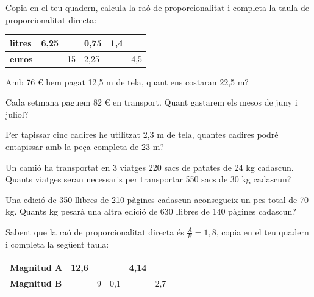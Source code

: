 
\begin{activitats}

\begin{mylist}
\exer
  Copia en el teu quadern, calcula la raó de proporcionalitat i completa
  la taula de proporcionalitat directa:

\begin{tabular}[]{@{}llllll@{}}
\toprule
\textbf{litres} & 6,25 & & 0,75 & 1,4 &\tabularnewline
\midrule
\textbf{euros} & & 15 & 2,25 & & 4,5\tabularnewline
\bottomrule
\end{tabular}



\exer
  Amb 76 \euro{} hem pagat 12,5 m de tela, quant ens costaran 22,5 m?
\answers{136.8 \euro{}}

\exer
  Cada setmana paguem 82 \euro{} en transport. Quant gastarem els mesos
  de juny i juliol?

\exer
  Per tapissar cinc cadires he utilitzat 2,3 m de tela, quantes
  cadires podré entapissar amb la peça completa de 23 m?


\exer
  Un camió ha transportat en 3 viatges 220 sacs de patates de 24 kg
  cadascun. Quants viatges seran necessaris per transportar 550 sacs de
  30 kg cadascun?
  
  
\exer
  Una edició de 350 llibres de 210 pàgines cadascun aconsegueix un pes
  total de 70 kg. Quants kg pesarà una altra edició de 630 llibres de
  140 pàgines cadascun?
  
  
\exer
  Sabent que la raó de proporcionalitat directa és $\frac{A}{B}
  = 1,8$, copia en el teu quadern i completa la següent taula:


\begin{tabular}[]{@{}llllll@{}}
\toprule
\textbf{Magnitud A} & 12,6 & & & 4,14 &\tabularnewline
\midrule
\textbf{Magnitud B} & & 9 & 0,1 & & 2,7\tabularnewline
\bottomrule
\end{tabular}


\end{mylist}
\end{activitats}
